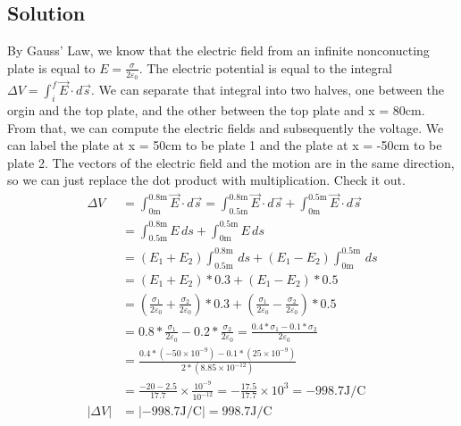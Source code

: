 \documentclass[12pt]{article}
\begin{document}
\subsection*{Solution}
By Gauss' Law, we know that the electric field from an infinite nonconucting plate is equal to $E = \frac{\sigma}{2\varepsilon_0}$.
The electric potential is equal to the integral $\Delta V = \int_{i}^{f} \vec{E}\cdot d\vec{s}$.
We can separate that integral into two halves, one between the orgin and the top plate, and the other between the top plate and x = 80cm.
From that, we can compute the electric fields and subsequently the voltage.
We can label the plate at x = 50cm to be plate 1 and the plate at x = -50cm to be plate 2.
The vectors of the electric field and the motion are in the same direction, so we can just replace the dot product with multiplication.
Check it out.
\begin{align*}
    \Delta V    &=  \int_{0\unit{\meter}}^{0.8\unit{\meter}} \vec{E} \cdot d\vec{s}
        =   \int_{0.5\unit{\meter}}^{0.8\unit{\meter}} \vec{E} \cdot d\vec{s} + \int_{0\unit{\meter}}^{0.5\unit{\meter}} \vec{E} \cdot d\vec{s}\\
        &=  \int_{0.5\unit{\meter}}^{0.8\unit{\meter}} E \,ds + \int_{0\unit{\meter}}^{0.5\unit{\meter}} E \,ds\\
        &=  (E_1 + E_2) \int_{0.5\unit{\meter}}^{0.8\unit{\meter}} \,ds + (E_1 - E_2) \int_{0\unit{\meter}}^{0.5\unit{\meter}} \,ds\\
        &=  (E_1 + E_2)*0.3 + (E_1 - E_2)*0.5\\
        &=  \left(\frac{\sigma_1}{2\varepsilon_0} + \frac{\sigma_2}{2\varepsilon_0}\right)*0.3 + \left(\frac{\sigma_1}{2\varepsilon_0} - \frac{\sigma_2}{2\varepsilon_0}\right)*0.5\\
        &=  0.8*\frac{\sigma_1}{2\varepsilon_0} - 0.2*\frac{\sigma_2}{2\varepsilon_0}
        =   \frac{0.4*\sigma_1 - 0.1*\sigma_2}{2\varepsilon_0}\\
        &=  \frac{0.4*(-50 \times 10^{-9}) - 0.1*(25 \times 10^{-9})}{2*(8.85 \times 10^{-12})}\\
        &=  \frac{-20 - 2.5}{17.7} \times \frac{10^{-9}}{10^{-12}}
        =   -\frac{17.5}{17.7} \times 10^3
        =   -998.7 \unit{\joule/\coulomb}\\
    \left|\Delta V\right|   &=  \left|-998.7 \unit{\joule/\coulomb}\right|
        =   \boxed{998.7 \unit{\joule/\coulomb}}
\end{align*}
\pagebreak
\end{document}
